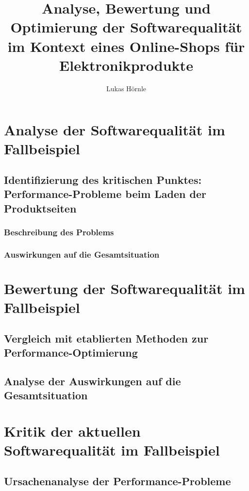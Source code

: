 \documentclass{article}
\begin{document}
\title{Analyse, Bewertung und Optimierung der Softwarequalität im Kontext eines Online-Shops für Elektronikprodukte}
\author{Lukas Hörnle}
\maketitle

\tableofcontents
\newpage






\section{Analyse der Softwarequalität im Fallbeispiel}
\subsection{Identifizierung des kritischen Punktes: Performance-Probleme beim Laden der Produktseiten}
\subsubsection{Beschreibung des Problems}
\subsubsection{Auswirkungen auf die Gesamtsituation}

\section{Bewertung der Softwarequalität im Fallbeispiel}
\subsection{Vergleich mit etablierten Methoden zur Performance-Optimierung}
\subsection{Analyse der Auswirkungen auf die Gesamtsituation}

\section{Kritik der aktuellen Softwarequalität im Fallbeispiel}
\subsection{Ursachenanalyse der Performance-Probleme}
\end{document}
